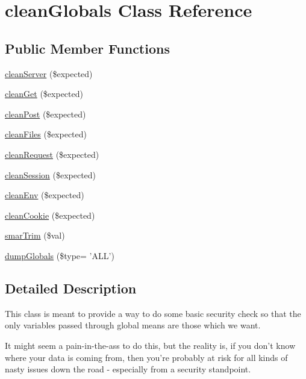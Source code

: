 \hypertarget{classclean_globals}{\section{clean\-Globals Class Reference}
\label{classclean_globals}
}
\subsection*{Public Member Functions}
\begin{DoxyCompactItemize}
\item 
\hyperlink{classclean_globals_a678376d6667cc0ec002adc25c86324c6}{clean\-Server} (\$expected)
\item 
\hyperlink{classclean_globals_a4e9a5b5055856ca666f84da4550bc533}{clean\-Get} (\$expected)
\item 
\hyperlink{classclean_globals_aa6304e8f875ab7d52e9222d73d65da69}{clean\-Post} (\$expected)
\item 
\hyperlink{classclean_globals_a2b45eb2bd13a3eef64305dea35cefc59}{clean\-Files} (\$expected)
\item 
\hyperlink{classclean_globals_a2b88fa5021c3ec111cdc0959291113e6}{clean\-Request} (\$expected)
\item 
\hyperlink{classclean_globals_a346b419ac285dd18d4a8f775b5220b30}{clean\-Session} (\$expected)
\item 
\hyperlink{classclean_globals_ab385235e1928fab7592f28558fb7315a}{clean\-Env} (\$expected)
\item 
\hyperlink{classclean_globals_a6f6791263b17958348708e199f34e2c7}{clean\-Cookie} (\$expected)
\item 
\hyperlink{classclean_globals_aa605f284eb4737350d6fcfc06f2906e2}{smar\-Trim} (\$val)
\item 
\hyperlink{classclean_globals_a3c055f32b320c6382ff6137969712d58}{dump\-Globals} (\$type= 'A\-L\-L')
\end{DoxyCompactItemize}


\subsection{Detailed Description}
This class is meant to provide a way to do some basic security check so that the only variables passed through global means are those which we want.

It might seem a pain-\/in-\/the-\/ass to do this, but the reality is, if you don't know where your data is coming from, then you're probably at risk for all kinds of nasty issues down the road -\/ especially from a security standpoint.

